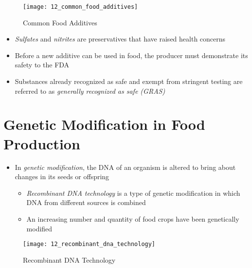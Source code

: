\documentclass[title={Chapter 12}]{fdsn201notes}
\begin{document}
\begin{figure}[H]
	\centering
	\texttt{[image: 12\_common\_food\_additives]}
	\caption{Common Food Additives}
	\label{fig:common-food-additives}
\end{figure}

\begin{itemize}
	\item \emph{Sulfates} and \emph{nitrites} are preservatives that have raised health concerns
	\item Before a new additive can be used in food, the producer must demonstrate its safety to the FDA
	\item Substances already recognized as safe and exempt from stringent testing are referred to as \emph{generally recognized as safe (GRAS)}
\end{itemize}

\section{Genetic Modification in Food Production}\label{sec:genetic-modification-in-food-production}
\begin{itemize}
	\item In \emph{genetic modification}, the DNA of an organism is altered to bring about changes in its seeds or offspring
	\begin{itemize}
		\item \emph{Recombinant DNA technology} is a type of genetic modification in which DNA from different sources is combined
		\item An increasing number and quantity of food crops have been genetically modified
	\end{itemize}
\end{itemize}

\begin{figure}[H]
	\centering
	\texttt{[image: 12\_recombinant\_dna\_technology]}
	\caption{Recombinant DNA Technology}
	\label{fig:recombinant-dna-technology}
\end{figure}
\end{document}
